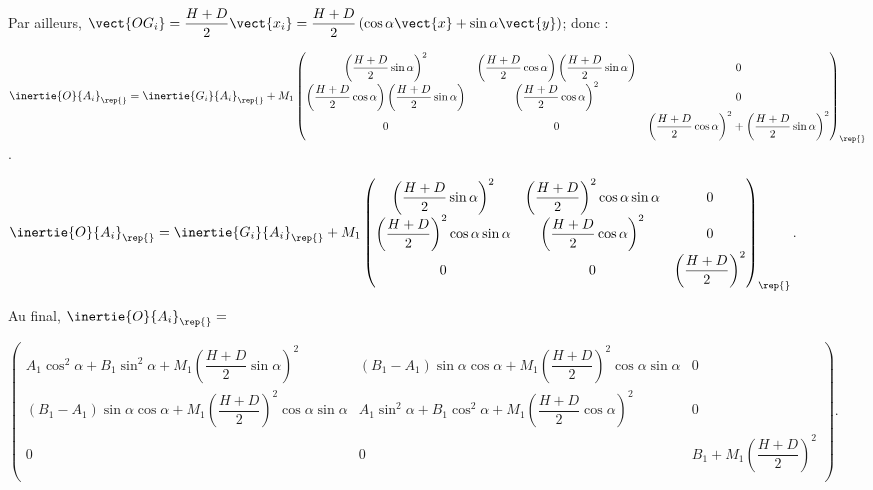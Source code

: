 \begin{corrige}


Par ailleurs, $\vect{OG_i}=\dfrac{H+D}{2}\vect{x_i}=\dfrac{H+D}{2}\left(\cos\alpha \vect{x}+\sin\alpha \vect{y} \right)$; donc :

  $\inertie{O}{A_i}_{\rep{}}=\inertie{G_i}{A_i}_{\rep{}}+M_1\begin{pmatrix}
\left( \dfrac{H+D}{2} \sin \alpha \right)^2 &\left( \dfrac{H+D}{2} \cos \alpha \right) \left( \dfrac{H+D}{2} \sin \alpha \right) & 0 \\ 
\left( \dfrac{H+D}{2} \cos \alpha \right) \left( \dfrac{H+D}{2} \sin \alpha \right) & \left( \dfrac{H+D}{2} \cos \alpha \right)^2& 0 \\
 0 & 0 &\left( \dfrac{H+D}{2} \cos \alpha \right)^2+\left( \dfrac{H+D}{2} \sin \alpha \right)^2 \\\end{pmatrix}_{\rep{}}$.
 
 
  $\inertie{O}{A_i}_{\rep{}}=\inertie{G_i}{A_i}_{\rep{}}+M_1\begin{pmatrix}
\left( \dfrac{H+D}{2} \sin \alpha \right)^2 &\left( \dfrac{H+D}{2} \right) ^2 \cos \alpha \sin \alpha  & 0 \\ 
\left( \dfrac{H+D}{2} \right) ^2 \cos \alpha \sin \alpha  & \left( \dfrac{H+D}{2} \cos \alpha \right)^2& 0 \\
 0 & 0 &\left( \dfrac{H+D}{2}\right)^2 \\\end{pmatrix}_{\rep{}}$.
 

Au final, 
$
\inertie{O}{A_i}_{\rep{}}=$

$
\begin{pmatrix}
A_1 \cos^2\alpha +B_1 \sin^2\alpha + M_1\left( \dfrac{H+D}{2} \sin \alpha \right)^2 
& \left( B_1-A_1\right) \sin\alpha\cos\alpha +M_1\left( \dfrac{H+D}{2} \right) ^2 \cos \alpha \sin \alpha 
& 0 \\ 
\left( B_1-A_1\right) \sin\alpha\cos\alpha +M_1 \left( \dfrac{H+D}{2} \right) ^2 \cos \alpha \sin \alpha 
&A_1\sin^2\alpha+ B_1\cos^2 \alpha +M_1\left( \dfrac{H+D}{2} \cos \alpha \right)^2
& 0 \\ 
0 & 0 & B_1+M_1\left( \dfrac{H+D}{2}\right)^2 \\ \end{pmatrix}
$.


\end{corrige}
